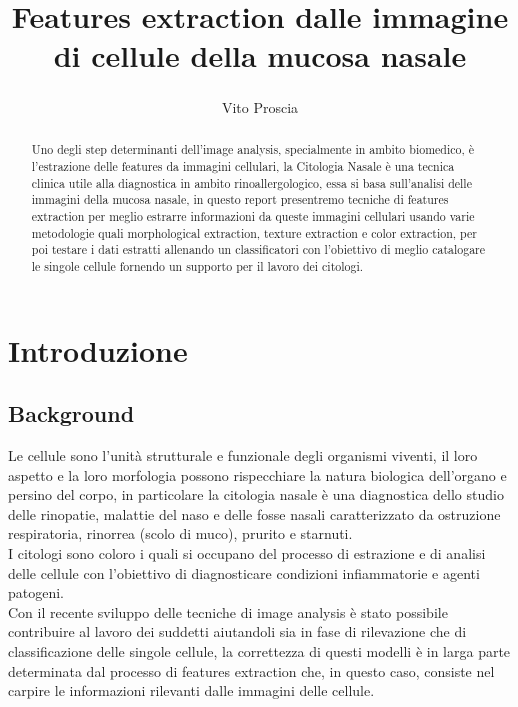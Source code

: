 \documentclass[italian,10pt,a4paper]{article}
\title{Features extraction dalle immagine di cellule della mucosa nasale}
\author{Vito Proscia\href{v.proscia3@studenti.uniba.it}{\textsuperscript{\Letter}}}
\date{} %
\begin{document}
	\maketitle
	
	\begin{abstract}
		Uno degli step determinanti dell'image analysis, specialmente in ambito biomedico, è l'estrazione delle features da immagini cellulari, la Citologia Nasale è una tecnica clinica utile alla diagnostica in ambito rinoallergologico, essa si basa sull'analisi delle immagini della mucosa nasale, in questo report presentremo tecniche di features extraction per meglio estrarre informazioni da queste immagini cellulari usando varie metodologie quali morphological extraction, texture extraction e color extraction, per poi testare i dati estratti allenando un classificatori con l'obiettivo di meglio catalogare le singole cellule fornendo un supporto per il lavoro dei citologi.  
	\end{abstract}
	
	\section{Introduzione}
		
		\subsection{Background}
		
			Le cellule sono l'unità strutturale e funzionale degli organismi viventi, il loro aspetto e la loro morfologia possono rispecchiare la natura biologica dell'organo e persino del corpo, in particolare la citologia nasale è una diagnostica dello studio delle rinopatie, malattie del naso e delle fosse nasali caratterizzato da ostruzione respiratoria, rinorrea (scolo di muco), prurito e starnuti.\\	
			I citologi sono coloro i quali si occupano del processo di estrazione e di analisi delle cellule con l'obiettivo di diagnosticare condizioni infiammatorie e agenti patogeni.\\
			\linebreak
			Con il recente sviluppo delle tecniche di image analysis è stato possibile contribuire al lavoro dei suddetti aiutandoli sia in fase di rilevazione che di classificazione delle singole cellule, la correttezza di questi modelli è in larga parte determinata dal processo di features extraction che, in questo caso, consiste nel carpire le informazioni rilevanti dalle immagini delle cellule.
			
\end{document}
